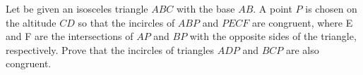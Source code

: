 Let be given an isosceles triangle $ABC$ with the base $AB$. A point $P$ is chosen on the altitude $CD$ so that the incircles of $ABP$ and $PECF$ are congruent, where E and F are the intersections of $AP$ and $BP$ with the opposite sides of the triangle, respectively. Prove that the incircles of triangles $ADP$ and $BCP$ are also congruent.
